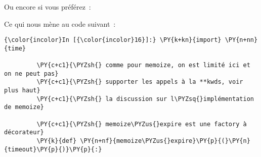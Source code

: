 Ou encore si vous préférez~:

\begin{Shaded}
\begin{Highlighting}[]
\OperatorTok{=}\NormalTok{)}
\OperatorTok{=}
\end{Highlighting}
\end{Shaded}

    Ce qui nous mène au code suivant~:

    \begin{Verbatim}[commandchars=\\\{\}]
{\color{incolor}In [{\color{incolor}16}]:} \PY{k+kn}{import} \PY{n+nn}{time}
         
         \PY{c+c1}{\PYZsh{} comme pour memoize, on est limité ici et on ne peut pas}
         \PY{c+c1}{\PYZsh{} supporter les appels à la **kwds, voir plus haut}
         \PY{c+c1}{\PYZsh{} la discussion sur l\PYZsq{}implémentation de memoize}
         
         \PY{c+c1}{\PYZsh{} memoize\PYZus{}expire est une factory à décorateur}
         \PY{k}{def} \PY{n+nf}{memoize\PYZus{}expire}\PY{p}{(}\PY{n}{timeout}\PY{p}{)}\PY{p}{:}
         

\end{Verbatim}

